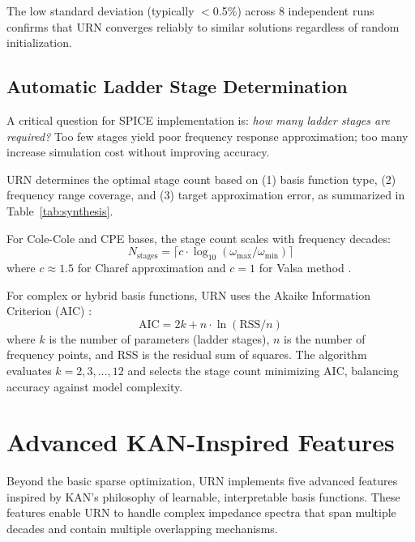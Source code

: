 \documentclass{ieeeaccess}
\begin{document}
The low standard deviation (typically $<$0.5\%) across 8 independent runs confirms that URN converges reliably to similar solutions regardless of random initialization.

\subsection{Automatic Ladder Stage Determination}
\label{sec:stage}

A critical question for SPICE implementation is: \textit{how many ladder stages are required?} Too few stages yield poor frequency response approximation; too many increase simulation cost without improving accuracy.

URN determines the optimal stage count based on (1) basis function type, (2) frequency range coverage, and (3) target approximation error, as summarized in Table~\ref{tab:synthesis}.

For Cole-Cole and CPE bases, the stage count scales with frequency decades:
\begin{equation}
N_{\text{stages}} = \lceil c \cdot \log_{10}(\omega_{\max}/\omega_{\min}) \rceil
\end{equation}
where $c \approx 1.5$ for Charef approximation \cite{charef1992fractal} and $c = 1$ for Valsa method \cite{valsa2013rc}.

For complex or hybrid basis functions, URN uses the Akaike Information Criterion (AIC) \cite{akaike1974new}:
\begin{equation}
\text{AIC} = 2k + n \cdot \ln(\text{RSS}/n)
\end{equation}
where $k$ is the number of parameters (ladder stages), $n$ is the number of frequency points, and RSS is the residual sum of squares. The algorithm evaluates $k = 2, 3, \ldots, 12$ and selects the stage count minimizing AIC, balancing accuracy against model complexity.

\section{Advanced KAN-Inspired Features}
\label{sec:kan_features}

Beyond the basic sparse optimization, URN implements five advanced features inspired by KAN's philosophy of learnable, interpretable basis functions. These features enable URN to handle complex impedance spectra that span multiple decades and contain multiple overlapping mechanisms.
\end{document}
